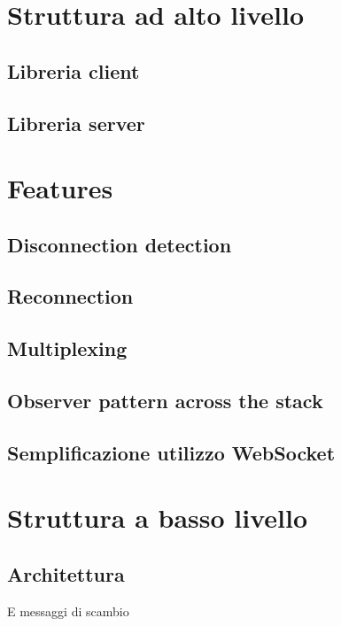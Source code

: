 \documentclass[12pt,a4paper,openright]{report}
\begin{document}
\section{Struttura ad alto livello}\label{sec_struttura}

\subsection{Libreria client}

\subsection{Libreria server}

\section{Features}\label{sec_features}

\subsection{Disconnection detection}

\subsection{Reconnection}

\subsection{Multiplexing}

\subsection{Observer pattern across the stack}

\subsection{Semplificazione utilizzo WebSocket}

\section{Struttura a basso livello}\label{sec_struttura}

\subsection{Architettura}
E messaggi di scambio
\end{document}
